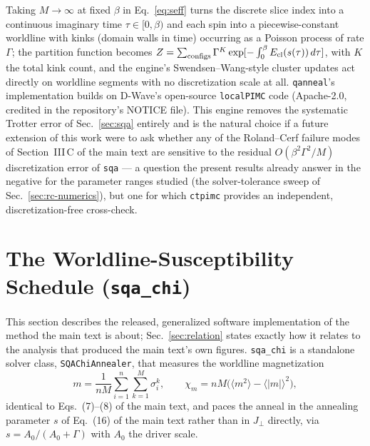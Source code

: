 \documentclass[11pt]{article}
\newcommand{\chim}{\chi_{m}}
\begin{document}
Taking $M\to\infty$ at fixed $\beta$ in Eq.~\eqref{eq:seff} turns the discrete slice index into a
continuous imaginary time $\tau\in[0,\beta)$ and each spin into a piecewise-constant worldline
with kinks (domain walls in time) occurring as a Poisson process of rate $\Gamma$; the partition
function becomes $Z=\sum_{\rm configs} \Gamma^K \exp[-\int_0^\beta E_{\rm cl}(s(\tau))\,d\tau]$,
with $K$ the total kink count, and the engine's Swendsen--Wang-style cluster updates act directly
on worldline segments with no discretization scale at all. \texttt{qanneal}'s implementation
builds on D-Wave's open-source \texttt{localPIMC} code (Apache-2.0, credited in the repository's
NOTICE file). This engine removes the systematic Trotter error of Sec.~\ref{sec:sqa} entirely and
is the natural choice if a future extension of this work were to ask whether any of the
Roland--Cerf failure modes of Section~III\,C of the main text are sensitive to the residual
$O(\beta^2\Gamma^2/M)$ discretization error of \texttt{sqa} --- a question the present results
already answer in the negative for the parameter ranges studied (the solver-tolerance sweep of
Sec.~\ref{sec:rc-numerics}), but one for which \texttt{ctpimc} provides an independent,
discretization-free cross-check.

\section{The Worldline-Susceptibility Schedule (\texttt{sqa\_chi})}
\label{sec:sqachi}

This section describes the released, generalized software implementation of the method the main
text is about; Sec.~\ref{sec:relation} states exactly how it relates to the analysis that produced
the main text's own figures. \texttt{sqa\_chi} is a standalone solver
class, \texttt{SQAChiAnnealer}, that measures the worldline magnetization
\begin{equation}
m = \frac{1}{nM}\sum_{i=1}^n\sum_{k=1}^M \sigma_i^k, \qquad
\chim = nM\big(\langle m^2\rangle - \langle|m|\rangle^2\big),
\label{eq:chim-def}
\end{equation}
identical to Eqs.~(7)--(8) of the main text, and paces the anneal in the annealing parameter $s$
of Eq.~(16) of the main text rather than in $J_\perp$ directly, via $s=A_0/(A_0+\Gamma)$ with
$A_0$ the driver scale.
\end{document}
